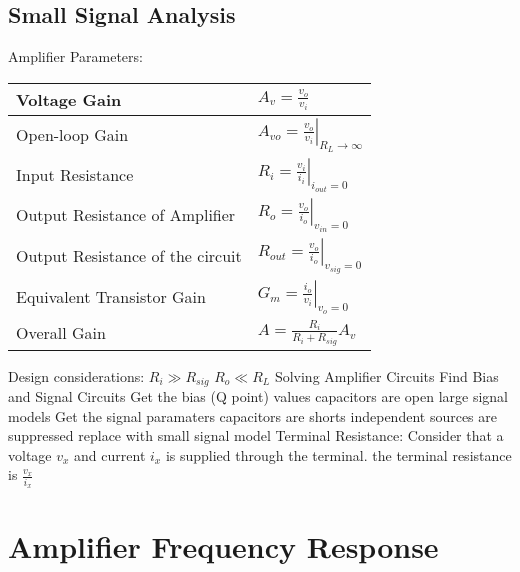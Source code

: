 \documentclass[a4paper,11pt]{article}
\begin{document}
	\subsection{Small Signal Analysis}
	\begin{outline}[enumerate]
		\1 Amplifier Parameters:
			\begin{center}
			\begin{tabular}{|l|l|}
				\hline 
				Voltage Gain & $A_{v} = \frac{v_{o}}{v_{i}}$ \\ \hline 
				Open-loop Gain & $A_{vo} = \left. \frac{v_{o}}{v_{i}} \right|_{R_{L} \to \infty}$ \\ \hline
				Input Resistance & $R_{i} = \left. \frac{v_{i}}{i_{i}} \right|_{i_{out} = 0}$ \\ \hline
				Output Resistance of Amplifier & $R_{o} = \left. \frac{v_{o}}{i_{o}} \right|_{v_{in} = 0}$ \\ \hline
				Output Resistance of the circuit & $R_{out} = \left. \frac{v_{o}}{i_{o}} \right|_{v_{sig} = 0}$ \\ \hline
				Equivalent Transistor Gain & $G_{m} = \left. \frac{i_{o}}{v_{i}} \right|_{v_{o} = 0}$ \\ \hline
				Overall Gain & $A = \frac{R_{i}}{R_{i} + R_{sig}}A_{v}$ \\ \hline
			\end{tabular}
			\end{center}
		
		\vspace{10mm}
		\1 Design considerations:
			\2 $R_{i} \gg R_{sig}$
			\2 $R_{o} \ll R_{L}$
		\1 Solving Amplifier Circuits
			\2 Find Bias and Signal Circuits
			\2 Get the bias (Q point) values	
				\3 capacitors are open
				\3 large signal models
			\2 Get the signal paramaters	
				\3 capacitors are shorts
				\3 independent sources are suppressed
				\3 replace with small signal model	
			\2 Terminal Resistance:
				\3 Consider that a voltage $v_{x}$ and current $i_{x}$	is supplied through the terminal. the terminal resistance is $\frac{v_{x}}{i_{x}}$
	\end{outline}
	
	\newpage
	\section{Amplifier Frequency Response}
\end{document}
